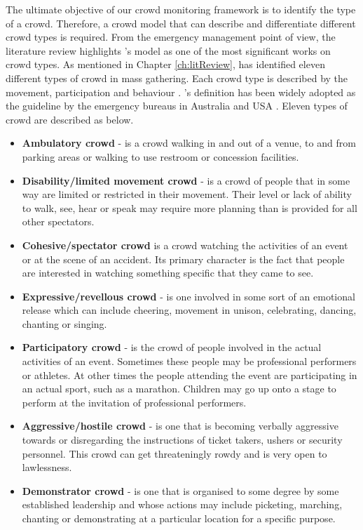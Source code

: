 The ultimate objective of our crowd monitoring framework is to identify the type of a crowd. Therefore, a crowd model that can describe and differentiate different crowd types is required. From the emergency management point of view, the literature review highlights \citet{Berlonghi1995}'s model as one of the most significant works on crowd types. As mentioned in Chapter \ref{ch:litReview}, \citet{Berlonghi1995} has identified eleven different types of crowd in mass gathering. Each crowd type is described by the movement, participation and behaviour \citep{Zeitz2009}. \citet{Berlonghi1995}'s definition has been widely adopted as the guideline by the emergency bureaus in Australia \citep{EMA1999} and USA \citep{FEMA2005}. Eleven types of crowd are described as below.
\begin{itemize}
\item \textbf{Ambulatory crowd} - is a crowd walking in and out of a venue, to and from parking areas or walking to use restroom or concession facilities.
\item \textbf{Disability/limited movement crowd} - is a crowd of people that in some way are limited or restricted in their movement. Their level or lack of ability to walk, see, hear or speak may require more planning than is provided for all other spectators.
\item \textbf{Cohesive/spectator crowd} is a crowd watching the activities of an event or at the scene of an accident. Its primary character is the fact that people are interested in watching something specific that they came to see.
\item \textbf{Expressive/revellous crowd} - is one involved in some sort of an emotional release which can include cheering, movement in unison, celebrating, dancing, chanting or singing.
\item \textbf{Participatory crowd} - is the crowd of people involved in the actual activities of an event. Sometimes these people may be professional performers or athletes. At other times the people attending the event are participating in an actual sport, such as a marathon. Children may go up onto a stage to perform at the invitation of professional performers.
\item \textbf{Aggressive/hostile crowd} - is one that is becoming verbally aggressive towards or disregarding the instructions of ticket takers, ushers or security personnel. This crowd can get threateningly rowdy and is very open to lawlessness.
\item \textbf{Demonstrator crowd} - is one that is organised to some degree by some established leadership and whose actions may include picketing, marching, chanting or demonstrating at a particular location for a specific purpose.

\end{itemize}
